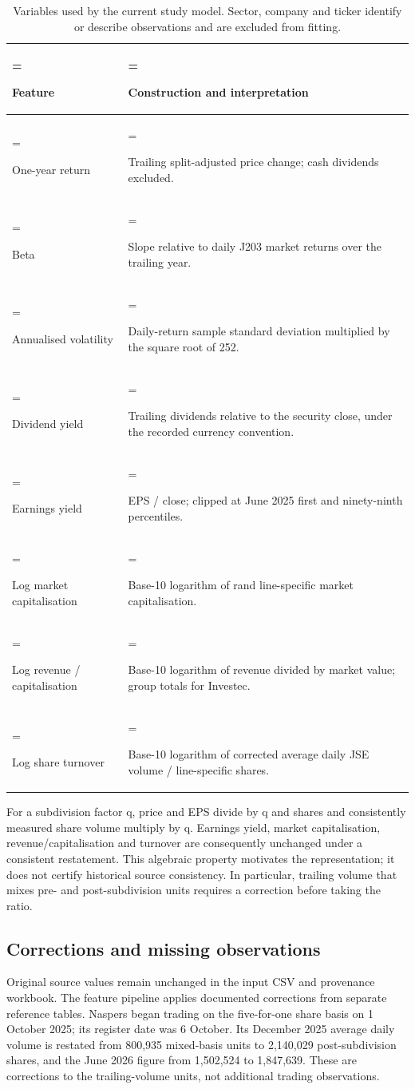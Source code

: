 \begin{table}[htbp]
\centering\caption{Variables used by the current study model. Sector, company and ticker identify or describe observations and are excluded from fitting.}\label{tab:2}
\footnotesize
\begin{tabularx}{\linewidth}{@{}>{\hsize=0.560\hsize\linewidth=\hsize\raggedright\arraybackslash}X >{\hsize=1.440\hsize\linewidth=\hsize\raggedright\arraybackslash}X@{}}
\toprule
Feature & Construction and interpretation \\
\midrule
One-year return & Trailing split-adjusted price change; cash dividends excluded. \\
Beta & Slope relative to daily J203 market returns over the trailing year. \\
Annualised volatility & Daily-return sample standard deviation multiplied by the square root of 252. \\
Dividend yield & Trailing dividends relative to the security close, under the recorded currency convention. \\
Earnings yield & EPS / close; clipped at June 2025 first and ninety-ninth percentiles. \\
Log market capitalisation & Base-10 logarithm of rand line-specific market capitalisation. \\
Log revenue / capitalisation & Base-10 logarithm of revenue divided by market value; group totals for Investec. \\
Log share turnover & Base-10 logarithm of corrected average daily JSE volume / line-specific shares. \\
\bottomrule
\end{tabularx}
\end{table}


For a subdivision factor q, price and EPS divide by q and shares and consistently measured share volume multiply by q. Earnings yield, market capitalisation, revenue/capitalisation and turnover are consequently unchanged under a consistent restatement. This algebraic property motivates the representation; it does not certify historical source consistency. In particular, trailing volume that mixes pre- and post-subdivision units requires a correction before taking the ratio.


\subsection{Corrections and missing observations}

Original source values remain unchanged in the input CSV and provenance workbook. The feature pipeline applies documented corrections from separate reference tables. Naspers began trading on the five-for-one share basis on 1 October 2025; its register date was 6 October. Its December 2025 average daily volume is restated from 800,935 mixed-basis units to 2,140,029 post-subdivision shares, and the June 2026 figure from 1,502,524 to 1,847,639. These are corrections to the trailing-volume units, not additional trading observations.


